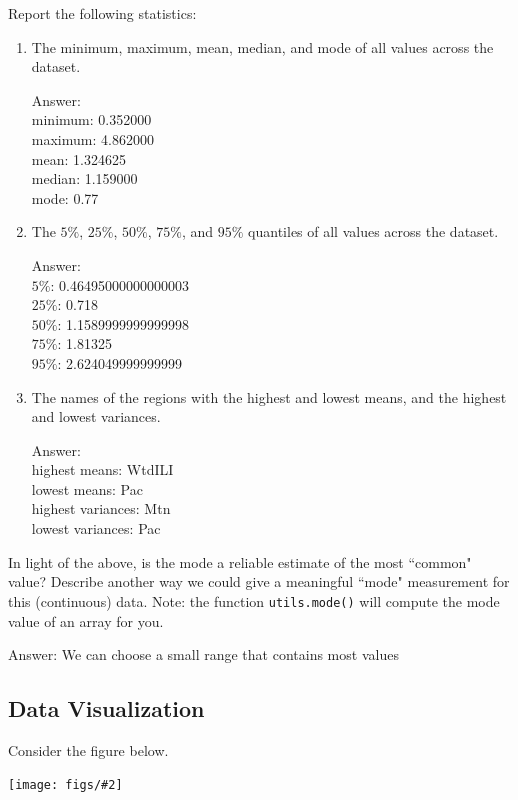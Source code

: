 \documentclass{article}
\def\ans#1{\par\gre{Answer: #1}}
\def\blu#1{{\color{blu}#1}}
\def\gre#1{{\color{gre}#1}}
\newcommand{\centerfig}[2]{\begin{center}\texttt{[image: figs/\#2]}\end{center}}
\begin{document}
  \blu{Report the following statistics}:
  \begin{enumerate}
  \item The minimum, maximum, mean, median, and mode of all values across the dataset.
  \ans{\\
    minimum: 0.352000 \\
    maximum: 4.862000 \\
    mean: 1.324625 \\
    median: 1.159000\\
    mode: 0.77}
  \item The $5\%$, $25\%$, $50\%$, $75\%$, and $95\%$ quantiles of all values across the dataset.
  \ans{\\
  $5\%$: 0.46495000000000003\\
  $25\%$: 0.718\\
  $50\%$: 1.1589999999999998\\
  $75\%$: 1.81325\\
  $95\%$: 2.624049999999999\\
  }
  \item The names of the regions with the highest and lowest means, and the highest and lowest variances.%
  \ans{\\
    highest means: WtdILI\\
    lowest means: Pac\\
    highest variances: Mtn\\
    lowest variances: Pac
  }
  \end{enumerate}
  In light of the above, \blu{is the mode a reliable estimate of the most ``common" value? Describe another way we could give a meaningful ``mode" measurement for this (continuous) data.} Note: the function \texttt{utils.mode()} will compute the mode value of an array for you.
  \ans{We can choose a small range that contains most values}
  \clearpage

  \subsection{Data Visualization}

  Consider the figure below.

  \centerfig{.9}{visualize-unlabeled.pdf}
\end{document}
